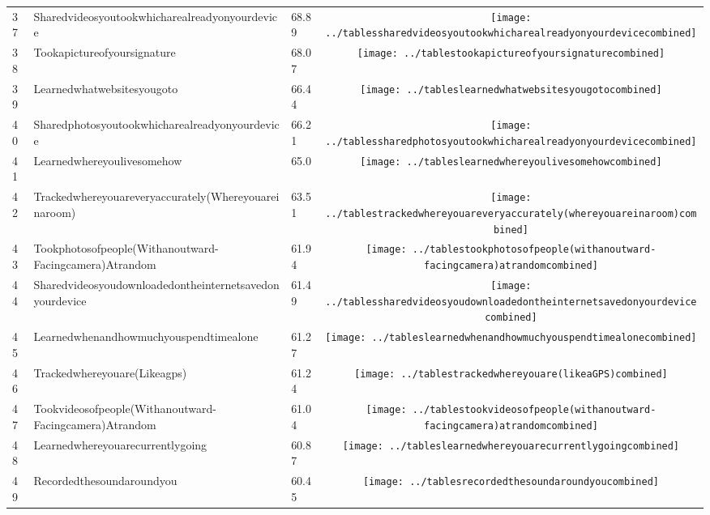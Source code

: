 \documentclass[a4paper,12pt]{article}
\begin{document}
\begin{longtable}{| p{0.5cm} | p{7cm} | p{1cm} | c |}
37 & Sharedvideosyoutookwhicharealreadyonyourdevice & 68.89 & \texttt{[image: ../tablessharedvideosyoutookwhicharealreadyonyourdevicecombined]} \\ 
38 & Tookapictureofyoursignature & 68.07 & \texttt{[image: ../tablestookapictureofyoursignaturecombined]} \\ 
39 & Learnedwhatwebsitesyougoto & 66.44 & \texttt{[image: ../tableslearnedwhatwebsitesyougotocombined]} \\ 
40 & Sharedphotosyoutookwhicharealreadyonyourdevice & 66.21 & \texttt{[image: ../tablessharedphotosyoutookwhicharealreadyonyourdevicecombined]} \\ 
41 & Learnedwhereyoulivesomehow & 65.0 & \texttt{[image: ../tableslearnedwhereyoulivesomehowcombined]} \\ 
42 & Trackedwhereyouareveryaccurately(Whereyouareinaroom) & 63.51 & \texttt{[image: ../tablestrackedwhereyouareveryaccurately(whereyouareinaroom)combined]} \\ 
43 & Tookphotosofpeople(Withanoutward-Facingcamera)Atrandom & 61.94 & \texttt{[image: ../tablestookphotosofpeople(withanoutward-facingcamera)atrandomcombined]} \\ 
44 & Sharedvideosyoudownloadedontheinternetsavedonyourdevice & 61.49 & \texttt{[image: ../tablessharedvideosyoudownloadedontheinternetsavedonyourdevicecombined]} \\ 
45 & Learnedwhenandhowmuchyouspendtimealone & 61.27 & \texttt{[image: ../tableslearnedwhenandhowmuchyouspendtimealonecombined]} \\ 
46 & Trackedwhereyouare(Likeagps) & 61.24 & \texttt{[image: ../tablestrackedwhereyouare(likeaGPS)combined]} \\ 
47 & Tookvideosofpeople(Withanoutward-Facingcamera)Atrandom & 61.04 & \texttt{[image: ../tablestookvideosofpeople(withanoutward-facingcamera)atrandomcombined]} \\ 
48 & Learnedwhereyouarecurrentlygoing & 60.87 & \texttt{[image: ../tableslearnedwhereyouarecurrentlygoingcombined]} \\ 
49 & Recordedthesoundaroundyou & 60.45 & \texttt{[image: ../tablesrecordedthesoundaroundyoucombined]} \\ 

\end{longtable}
\end{document}
